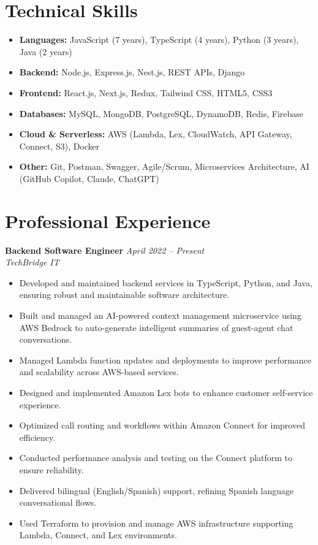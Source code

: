 \documentclass[10pt,letterpaper]{article}
\begin{document}
\section*{Technical Skills}
\begin{itemize}
    \item \textbf{Languages:} JavaScript (7 years), TypeScript (4 years), Python (3 years), Java (2 years)
    \item \textbf{Backend:} Node.js, Express.js, Nest.js, REST APIs, Django
    \item \textbf{Frontend:} React.js, Next.js, Redux, Tailwind CSS, HTML5, CSS3
    \item \textbf{Databases:} MySQL, MongoDB, PostgreSQL, DynamoDB, Redis, Firebase
    \item \textbf{Cloud \& Serverless:} AWS (Lambda, Lex, CloudWatch, API Gateway, Connect, S3), Docker
    \item \textbf{Other:} Git, Postman, Swagger, Agile/Scrum, Microservices Architecture, AI (GitHub Copilot, Claude, ChatGPT)
\end{itemize}

\section*{Professional Experience}

\textbf{Backend Software Engineer} \hfill \textit{April 2022 -- Present}\\
\textit{TechBridge IT}
\begin{itemize}
    \item Developed and maintained backend services in TypeScript, Python, and Java, ensuring robust and maintainable software architecture.
    \item Built and managed an AI-powered context management microservice using AWS Bedrock to auto-generate intelligent summaries of guest-agent chat conversations.
    \item Managed Lambda function updates and deployments to improve performance and scalability across AWS-based services.
    \item Designed and implemented Amazon Lex bots to enhance customer self-service experience.
    \item Optimized call routing and workflows within Amazon Connect for improved efficiency.
    \item Conducted performance analysis and testing on the Connect platform to ensure reliability.
    \item Delivered bilingual (English/Spanish) support, refining Spanish language conversational flows.
    \item Used Terraform to provision and manage AWS infrastructure supporting Lambda, Connect, and Lex environments.
\end{itemize}
\end{document}
